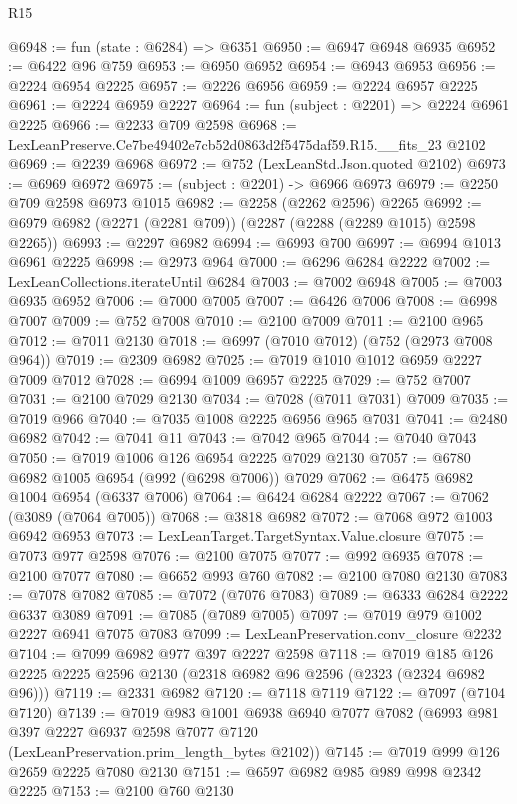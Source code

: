\begin{lexlean}{R15}
\begin{coremodule}
@6948 := fun (state : @6284) => @6351
@6950 := @6947 @6948 @6935
@6952 := @6422 @96 @759
@6953 := @6950 @6952
@6954 := @6943 @6953
@6956 := @2224 @6954 @2225
@6957 := @2226 @6956
@6959 := @2224 @6957 @2225
@6961 := @2224 @6959 @2227
@6964 := fun (subject : @2201) => @2224 @6961 @2225
@6966 := @2233 @709 @2598
@6968 := LexLeanPreserve.Ce7be49402e7cb52d0863d2f5475daf59.R15.__fits_23 @2102
@6969 := @2239 @6968
@6972 := @752 (LexLeanStd.Json.quoted @2102)
@6973 := @6969 @6972
@6975 := (subject : @2201) -> @6966 @6973
@6979 := @2250 @709 @2598 @6973 @1015
@6982 := @2258 (@2262 @2596) @2265
@6992 := @6979 @6982 (@2271 (@2281 @709)) (@2287 (@2288 (@2289 @1015) @2598 @2265))
@6993 := @2297 @6982
@6994 := @6993 @700
@6997 := @6994 @1013 @6961 @2225
@6998 := @2973 @964
@7000 := @6296 @6284 @2222
@7002 := LexLeanCollections.iterateUntil @6284
@7003 := @7002 @6948
@7005 := @7003 @6935 @6952
@7006 := @7000 @7005
@7007 := @6426 @7006
@7008 := @6998 @7007
@7009 := @752 @7008
@7010 := @2100 @7009
@7011 := @2100 @965
@7012 := @7011 @2130
@7018 := @6997 (@7010 @7012) (@752 (@2973 @7008 @964))
@7019 := @2309 @6982
@7025 := @7019 @1010 @1012 @6959 @2227 @7009 @7012
@7028 := @6994 @1009 @6957 @2225
@7029 := @752 @7007
@7031 := @2100 @7029 @2130
@7034 := @7028 (@7011 @7031) @7009
@7035 := @7019 @966
@7040 := @7035 @1008 @2225 @6956 @965 @7031
@7041 := @2480 @6982
@7042 := @7041 @11
@7043 := @7042 @965
@7044 := @7040 @7043
@7050 := @7019 @1006 @126 @6954 @2225 @7029 @2130
@7057 := @6780 @6982 @1005 @6954 (@992 (@6298 @7006)) @7029
@7062 := @6475 @6982 @1004 @6954 (@6337 @7006)
@7064 := @6424 @6284 @2222
@7067 := @7062 (@3089 (@7064 @7005))
@7068 := @3818 @6982
@7072 := @7068 @972 @1003 @6942 @6953
@7073 := LexLeanTarget.TargetSyntax.Value.closure
@7075 := @7073 @977 @2598
@7076 := @2100 @7075
@7077 := @992 @6935
@7078 := @2100 @7077
@7080 := @6652 @993 @760
@7082 := @2100 @7080 @2130
@7083 := @7078 @7082
@7085 := @7072 (@7076 @7083)
@7089 := @6333 @6284 @2222 @6337 @3089
@7091 := @7085 (@7089 @7005)
@7097 := @7019 @979 @1002 @2227 @6941 @7075 @7083
@7099 := LexLeanPreservation.conv_closure @2232
@7104 := @7099 @6982 @977 @397 @2227 @2598
@7118 := @7019 @185 @126 @2225 @2225 @2596 @2130 (@2318 @6982 @96 @2596 (@2323 (@2324 @6982 @96)))
@7119 := @2331 @6982
@7120 := @7118 @7119
@7122 := @7097 (@7104 @7120)
@7139 := @7019
    @983
    @1001
    @6938
    @6940
    @7077
    @7082
    (@6993 @981 @397 @2227 @6937 @2598 @7077 @7120 (LexLeanPreservation.prim_length_bytes @2102))
@7145 := @7019 @999 @126 @2659 @2225 @7080 @2130
@7151 := @6597 @6982 @985 @989 @998 @2342 @2225
@7153 := @2100 @760 @2130

\end{coremodule}
\end{lexlean}
